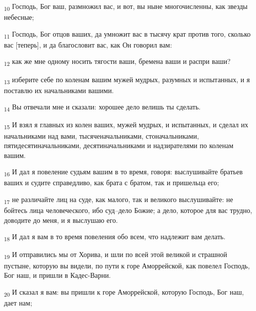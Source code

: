 \begin{tcolorbox}
\textsubscript{10} Господь, Бог ваш, размножил вас, и вот, вы ныне многочисленны, как звезды небесные;
\end{tcolorbox}
\begin{tcolorbox}
\textsubscript{11} Господь, Бог отцов ваших, да умножит вас в тысячу крат против того, сколько вас [теперь], и да благословит вас, как Он говорил вам:
\end{tcolorbox}
\begin{tcolorbox}
\textsubscript{12} как же мне одному носить тягости ваши, бремена ваши и распри ваши?
\end{tcolorbox}
\begin{tcolorbox}
\textsubscript{13} изберите себе по коленам вашим мужей мудрых, разумных и испытанных, и я поставлю их начальниками вашими.
\end{tcolorbox}
\begin{tcolorbox}
\textsubscript{14} Вы отвечали мне и сказали: хорошее дело велишь ты сделать.
\end{tcolorbox}
\begin{tcolorbox}
\textsubscript{15} И взял я главных из колен ваших, мужей мудрых, и испытанных, и сделал их начальниками над вами, тысяченачальниками, стоначальниками, пятидесятиначальниками, десятиначальниками и надзирателями по коленам вашим.
\end{tcolorbox}
\begin{tcolorbox}
\textsubscript{16} И дал я повеление судьям вашим в то время, говоря: выслушивайте братьев ваших и судите справедливо, как брата с братом, так и пришельца его;
\end{tcolorbox}
\begin{tcolorbox}
\textsubscript{17} не различайте лиц на суде, как малого, так и великого выслушивайте: не бойтесь лица человеческого, ибо суд--дело Божие; а дело, которое для вас трудно, доводите до меня, и я выслушаю его.
\end{tcolorbox}
\begin{tcolorbox}
\textsubscript{18} И дал я вам в то время повеления обо всем, что надлежит вам делать.
\end{tcolorbox}
\begin{tcolorbox}
\textsubscript{19} И отправились мы от Хорива, и шли по всей этой великой и страшной пустыне, которую вы видели, по пути к горе Аморрейской, как повелел Господь, Бог наш, и пришли в Кадес-Варни.
\end{tcolorbox}
\begin{tcolorbox}
\textsubscript{20} И сказал я вам: вы пришли к горе Аморрейской, которую Господь, Бог наш, дает нам;
\end{tcolorbox}
